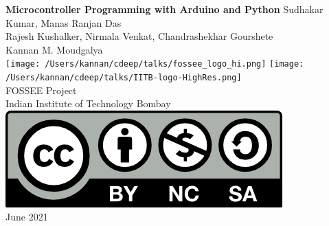 \begin{center}
{\bf {\Huge Microcontroller Programming with Arduino and Python}}
\vfill
%
Sudhakar Kumar, Manas Ranjan Das \\
Rajesh Kushalker, Nirmala Venkat, Chandrashekhar Gourshete \\
Kannan M. Moudgalya \\
\vfill
\texttt{[image: /Users/kannan/cdeep/talks/fossee\_logo\_hi.png]} \quad
\texttt{[image: /Users/kannan/cdeep/talks/IITB-logo-HighRes.png]} \\
FOSSEE Project \\
Indian Institute of Technology Bombay \\ [2mm]
\includegraphics[width=0.15\linewidth]{by-nc-sa.png} \\ [1mm]
June 2021
\end{center}

\clearpage
